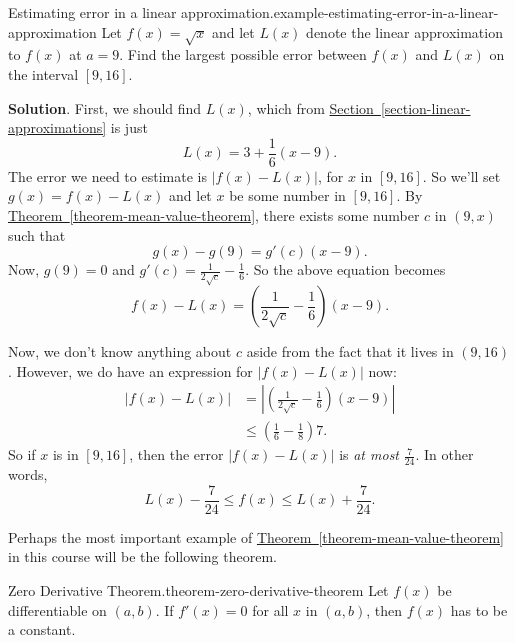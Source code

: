 \documentclass[10pt,]{book}
\numberwithin{equation}{section}
\begin{document}
\begin{example}{Estimating error in a linear approximation.}{example-estimating-error-in-a-linear-approximation}%
\hypertarget{p-340}{}%
Let \(f(x) = \sqrt{x}\) and let \(L(x)\) denote the linear approximation to \(f(x)\) at \(a=9\). Find the largest possible error between \(f(x)\) and \(L(x)\) on the interval \([9,16]\).%
\par\smallskip%
\noindent\textbf{Solution}.\hypertarget{solution-74}{}\quad%
\hypertarget{p-341}{}%
First, we should find \(L(x)\), which from \hyperref[section-linear-approximations]{Section~\ref{section-linear-approximations}} is just%
\begin{equation*}
L(x) = 3 + \frac{1}{6}(x-9).
\end{equation*}
The error we need to estimate is \(|f(x) - L(x)|\), for \(x\) in \([9,16]\). So we'll set \(g(x) = f(x) - L(x)\) and let \(x\) be some number in \([9,16]\). By \hyperref[theorem-mean-value-theorem]{Theorem~\ref{theorem-mean-value-theorem}}, there exists some number \(c\) in \((9,x)\) such that%
\begin{equation*}
g(x) - g(9) = g'(c)(x-9).
\end{equation*}
Now, \(g(9) = 0\) and \(g'(c) = \frac{1}{2\sqrt{c}} - \frac{1}{6}\). So the above equation becomes%
\begin{equation*}
f(x) - L(x) = \left(\frac{1}{2\sqrt{c}} - \frac{1}{6}\right)(x-9).
\end{equation*}
%
\par
\hypertarget{p-342}{}%
Now, we don't know anything about \(c\) aside from the fact that it lives in \((9,16)\). However, we do have an expression for \(|f(x) - L(x)|\) now:%
\begin{align*}
|f(x) - L(x)| & = \left|\left(\frac{1}{2\sqrt{c}} - \frac{1}{6}\right)(x-9)\right|\\
& \leq \left(\frac{1}{6} - \frac{1}{8}\right)7. 
\end{align*}
So if \(x\) is in \([9,16]\), then the error \(|f(x) - L(x)|\) is \emph{at most} \(\frac{7}{24}\). In other words,%
\begin{equation*}
L(x) - \frac{7}{24} \leq f(x) \leq L(x) + \frac{7}{24}.
\end{equation*}
%
\end{example}
\hypertarget{p-343}{}%
Perhaps the most important example of \hyperref[theorem-mean-value-theorem]{Theorem~\ref{theorem-mean-value-theorem}} in this course will be the following theorem.%
\begin{theorem}{Zero Derivative Theorem.}{}{theorem-zero-derivative-theorem}%
\hypertarget{p-344}{}%
Let \(f(x)\) be differentiable on \((a,b)\). If \(f'(x) = 0\) for all \(x\) in \((a,b)\), then \(f(x)\) has to be a constant.%
\end{theorem}
\end{document}
